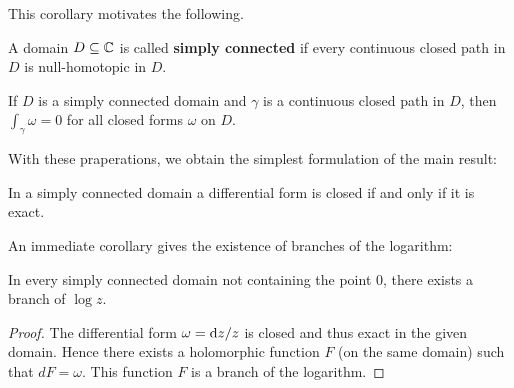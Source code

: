 This corollary motivates the following.
\begin{definition}
A domain $D\subseteq\mathbb{C}$ is called \textbf{simply connected} if every continuous closed path in $D$ is null-homotopic in $D$.
\end{definition}
\begin{corollary}
If $D$ is a simply connected domain and $\gamma$ is a continuous closed path in $D$, then $\int_{\gamma}\omega=0$ for all closed forms $\omega$ on $D$.
\end{corollary}
With these praperations, we obtain the simplest formulation of the main result:
\begin{corollary}
In a simply connected domain a differential form is closed if and only if it is exact.
\end{corollary}
An immediate corollary gives the existence of branches of the logarithm:
\begin{proposition}
In every simply connected domain not containing the point $0$, there exists a branch of $\log z$.
\end{proposition}
\begin{proof}
The differential form $\omega=\mathop{}\!\mathrm{d} z/z$ is closed and thus exact in the given domain. Hence there exists a holomorphic function $F$ (on the same domain) such that $dF=\omega$. This function $F$ is a branch of the logarithm.
\end{proof}
